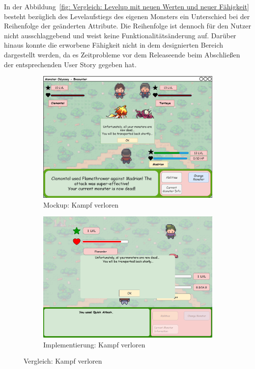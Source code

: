 In der Abbildung~\ref{fig: Vergleich: Levelup mit neuen Werten und neuer Fähigkeit} besteht bezüglich des Levelaufstiegs des eigenen Monsters ein Unterschied bei der Reihenfolge der geänderten Attribute. Die Reihenfolge ist dennoch für den Nutzer nicht ausschlaggebend und weist keine Funktionalitätsänderung auf. Darüber hinaus konnte die erworbene Fähigkeit nicht in dem designierten Bereich dargestellt werden, da es Zeitprobleme vor dem Releaseende beim Abschließen der entsprechenden User Story gegeben hat.
\begin{figure}[H]
    \centering
    \begin{subfigure}[b]{0.4\textwidth}
        \includegraphics[width=\textwidth]{images/mockups/Encounter/Encounter1v2OpponentAttackedAndLostPopup.png}
        \caption{Mockup: \phantom{Kampfve}Kampf verloren}
        \label{fig: Mockup: Kampf verloren}
    \end{subfigure}
    \hfill
    \begin{subfigure}[b]{0.4\textwidth}
        \includegraphics[width=\textwidth]{images/implementation/Encounter/encounterverloren.PNG}
        \caption{Implementierung: Kampf verloren}
        \label{fig: Implementierung: Kampf verloren}
    \end{subfigure}
    \caption{Vergleich: Kampf verloren}
    \label{fig: Vergleich: Kampf verloren}
\end{figure}
